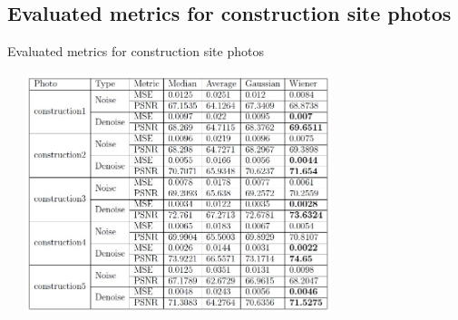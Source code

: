 \documentclass{beamer}
\begin{document}
\subsection{Evaluated metrics for construction site photos
}
\begin{frame}{Evaluated metrics for construction site photos
}
\begin{center}
\includegraphics[width=10cm,height=7cm]{con1.jpg}

\end{center}
\end{frame}
\end{document}
